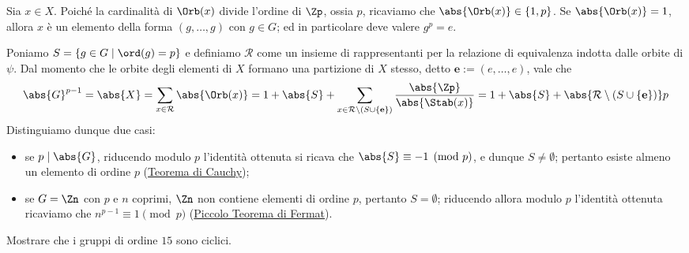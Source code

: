 \documentclass[11pt]{scrartcl}
\begin{document}
	Sia $x \in X$. Poiché la cardinalità di $\Orb(x)$ divide l'ordine di $\Zp$, ossia
	$p$, ricaviamo che $\abs{\Orb(x)} \in \{1, p\}$. Se $\abs{\Orb(x)} = 1$, allora
	$x$ è un elemento della forma $(g, \ldots, g)$ con $g \in G$; ed in particolare
	deve valere $g^p = e$. \medskip

	Poniamo $S = \{g\in G \mid \ord(g) = p\}$ e definiamo $\mathcal{R}$ come un insieme di 
	rappresentanti per la relazione di equivalenza indotta dalle orbite di $\psi$. Dal
	momento che
	le orbite degli elementi di $X$ formano una partizione di $X$ stesso, detto
	$\mathbf{e} := (e, \ldots, e)$, vale che
	\[
	\abs{G}^{p - 1} = \abs{X} = \sum_{x \in \mathcal{R}} \abs{\Orb(x)} = 1 + \abs{S} + \sum_{x \in \mathcal{R}\setminus (S \cup \{ \mathbf{e} \} )} \frac{\abs{\Zp}}{\abs{\Stab(x)}} = 1 + \abs{S} + \abs{\mathcal{R} \setminus (S \cup \{ \mathbf{e} \})} p
	\]
	Distinguiamo dunque due casi:
	\begin{itemize}
		\item se $p \mid \abs{G}$, riducendo modulo $p$ l'identità ottenuta si ricava che
		$\abs{S} \equiv -1 \pmod p$, e dunque $S \neq \emptyset$; pertanto
		esiste almeno un elemento di
		ordine $p$ (\hyperref[teorema1.44]{Teorema di Cauchy});
		\item se $G = \Zn$ con $p$ e $n$ coprimi, $\Zn$ non contiene elementi
		di ordine $p$, pertanto $S = \emptyset$; riducendo allora modulo $p$ l'identità ottenuta ricaviamo che
		$n^{p - 1} \equiv 1 \pmod p$ (\hyperref[teorema1.45]{Piccolo Teorema di Fermat}).
	\end{itemize}
	
	\begin{exercise}
		Mostrare che i gruppi di ordine $15$ sono ciclici.
	\end{exercise}
	
\end{document}
